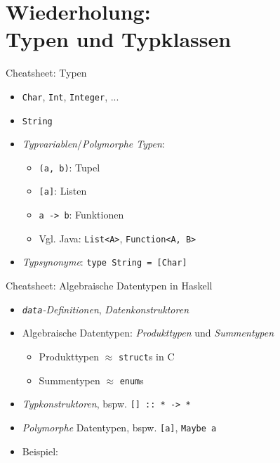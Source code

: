 \documentclass{beamer}
\begin{document}
\section{Wiederholung:\\Typen und Typklassen}

\begin{frame}{Cheatsheet: Typen}
  \begin{itemize}
    \item \texttt{Char}, \texttt{Int}, \texttt{Integer}, ...
    \item \texttt{String}
    \item \emph{Typvariablen}/\emph{Polymorphe Typen}:
    \begin{itemize}
      \item \texttt{(a, b)}: Tupel
      \item \texttt{[a]}: Listen
      \item \texttt{a -> b}: Funktionen
      \item Vgl. Java: \texttt{List<A>}, \texttt{Function<A, B>}
    \end{itemize}
    \item \emph{Typsynonyme}: \texttt{type String = [Char]}
  \end{itemize}
\end{frame}

\begin{frame}{Cheatsheet: Algebraische Datentypen in Haskell}
  \begin{itemize}
    \item \emph{\texttt{data}-Definitionen}, \emph{Datenkonstruktoren}
    \item Algebraische Datentypen: \emph{Produkttypen} und \emph{Summentypen}
    \begin{itemize}
      \item Produkttypen $\approx$ \texttt{struct}s in C
      \item Summentypen $\approx$ \texttt{enum}s
    \end{itemize}
    \item \emph{Typkonstruktoren}, bspw. \texttt{[] :: * -> *}
    \item \emph{Polymorphe} Datentypen, bspw. \texttt{[a]}, \texttt{Maybe a}
    \item Beispiel:
  \end{itemize}
\end{frame}
\end{document}
